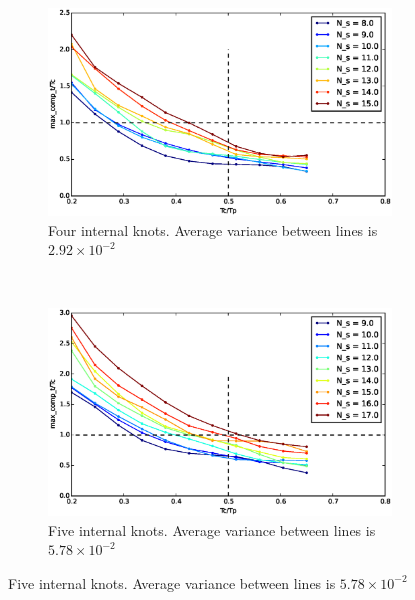 \begin{figure}
        \centering
        ~ %
        \begin{subfigure}[b]{0.48\textwidth}
                \includegraphics[width=\textwidth]{./img/realtime/Scenario_6__N_knots_4/mcttc-tctp.eps}
                \caption{Four internal knots.  Average variance between lines is $2.92\times 10^{-2}$}\label{fig:uni64}
        \end{subfigure}
        ~ %
        \begin{subfigure}[b]{0.48\textwidth}
                \includegraphics[width=\textwidth]{./img/realtime/Scenario_6__N_knots_5/mcttc-tctp.eps}
                \caption{Five internal knots.  Average variance between lines is $5.78\times 10^{-2}$}\label{fig:uni65}
        \end{subfigure}
        

\end{figure}
